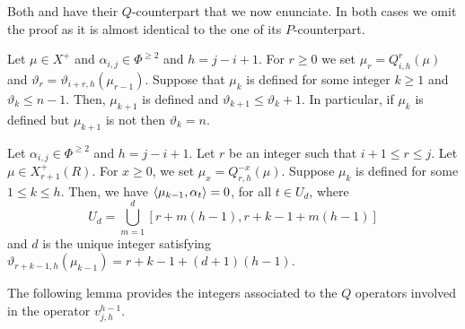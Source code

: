   

Both  and  have their $Q$-counterpart that we now enunciate. 
In both cases we omit the proof as it is almost identical to the one of its $P$-counterpart. 


\begin{lemma} \label{lem: desigualdad de varthetas}
    Let $\mu \in X^+$ and $\alpha_{i,j}\in \Phi^{\geq 2}$ and $h=j-i+1$. 
    For $r\geq 0$ we set $\mu_{r} = Q^{r}_{i,h}(\mu)$ and $\vartheta_{r}=\vartheta_{i+r,h}(\mu_{r-1})$.
    Suppose that $\mu_{k}$ is defined for some integer $k\geq 1$ and $\vartheta_{k} \leq n-1$.
    Then, $\mu_{k+1}$ is defined and $\vartheta_{k+1} \leq \vartheta_{k} + 1$.
In particular, if $\mu_{k}$ is defined but $\mu_{k+1}$ is not then $\vartheta_k =n$. 
\end{lemma}




\begin{corollary} \label{lem: ceros por Qs}  
    Let $\alpha_{i,j}\in \Phi^{\geq 2}$ and $h=j-i+1$. 
    Let $r$ be an integer such that $i+1\leq r\leq j$.
    Let $\mu \in X^+_{r+1}(R)$.
    For $x\geq 0$, we set $\mu_{x} = Q^{-x}_{r,h}(\mu)$.
    Suppose $\mu_k$ is defined for some $1\leq k\leq h$.
    Then, we have $\langle \mu_{k-1} , \alpha_{t} \rangle = 0$, for all $t\in U_d$, where
    \begin{equation}\label{eq: Ud de zeros en Q}
     U_{d} =   \bigcup_{m=1}^{d} [r + m(h-1), r + k -1 + m(h-1)]
    \end{equation}
  and  $d$ is the unique integer satisfying $\vartheta_{r+k-1,h}(\mu_{k-1}) = r+k-1 + (d+1)(h-1)$.  
\end{corollary}



The following lemma provides the integers associated to the $Q$ operators involved in the  operator $v^{h-1}_{j,h}$.



